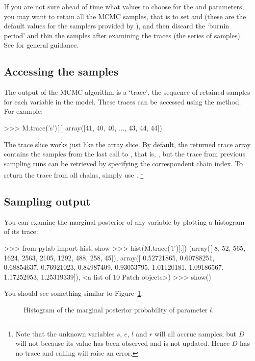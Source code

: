 \documentclass[]{jss}
\begin{document}
If you are not sure ahead of time what values to choose for the  and  parameters, you may want to retain all the MCMC samples, that is to set  and  (these are the default values for the samplers provided by ), and then discard the `burnin period' and thin the samples after examining the traces (the series of samples). See \citet{gelman} for general guidance.

\subsection{Accessing the samples}
The output of the MCMC algorithm is a `trace', the sequence of retained
samples for each variable in the model. These traces can be accessed
using the  method. For example:
\begin{CodeInput}
>>> M.trace('s')[:]
array([41, 40, 40, ..., 43, 44, 44])
\end{CodeInput}
The trace slice  works just like the  array
slice. By default, the returned trace array contains the samples from the
last call to , that is, , but the trace from
previous sampling runs can be retrieved by specifying the correspondent
chain index. To return the trace from all chains, simply use
. \footnote{Note that the unknown variables $s$, $e$, $l$ and $r$ will all
accrue samples, but $D$ will not because its value has been observed and is
not updated. Hence $D$ has no trace and calling  will
raise an error. }


\subsection{Sampling output}
You can examine the marginal posterior of any variable by plotting a histogram of its trace:
\begin{CodeInput}
>>> from pylab import hist, show
>>> hist(M.trace('l')[:])
(array([   8,   52,  565, 1624, 2563, 2105, 1292,  488,  258,   45]),
array([ 0.52721865,  0.60788251,  0.68854637,  0.76921023,  0.84987409,
       0.93053795,  1.01120181,  1.09186567,  1.17252953,  1.25319339]),
<a list of 10 Patch objects>)
>>> show()
\end{CodeInput}
You should see something similar to Figure~\ref{fig:hist}.
\begin{figure}[ht!]
\begin{center}
   \caption{Histogram of the marginal posterior probability of parameter $l$.}
	\label{fig:hist}
\end{center}
\end{figure}
\end{document}

